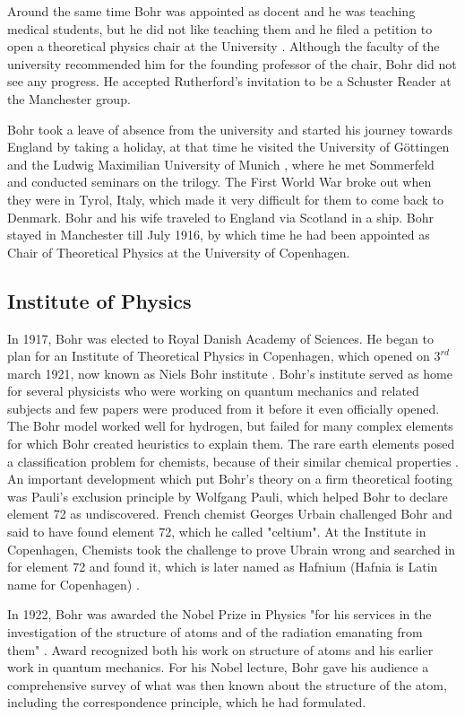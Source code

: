 \documentclass[11pt, article]{scrartcl}
\begin{document}
	Around the same time Bohr was appointed as docent and he was teaching medical students, but he did not like teaching them and he filed a petition to open 
	a theoretical physics chair at the University \cite{insti}. Although the faculty of the university recommended him for the founding professor of the chair, 
	Bohr did not see any progress. He accepted Rutherford's invitation to be a Schuster Reader at the Manchester group. 

	Bohr took a leave of absence from the university and started his journey towards England by taking a holiday, at that time he visited the University of
	Göttingen and the Ludwig Maximilian University of Munich \cite{bomb2}, where he met Sommerfeld and conducted seminars on the trilogy. The First World War broke
	out when they were in Tyrol, Italy, which made it very difficult for them to come back to Denmark. Bohr and his wife traveled to England via
	Scotland in a ship. Bohr stayed in Manchester till July 1916, by which time he had been appointed as Chair of Theoretical Physics at the University of Copenhagen. 

\subsection {Institute of Physics}
	In 1917, Bohr was elected to Royal Danish Academy of Sciences. He began to plan for an Institute of Theoretical Physics in Copenhagen, which opened on $3^{rd}$ march 1921, 
	now known as Niels Bohr institute \cite{insti}. Bohr's institute served as home for several physicists who were working on quantum
	mechanics and related subjects and few papers were produced from it before it even officially opened. The Bohr model worked well for hydrogen,
	but failed for many complex elements for which Bohr created heuristics to explain them. The rare earth elements posed a classification problem
	for chemists, because of their similar chemical properties \cite{bomb2}. An important development which put Bohr's theory on a firm theoretical footing was 
	Pauli's exclusion principle by Wolfgang Pauli, which helped Bohr to declare element 72 as undiscovered. French chemist Georges Urbain challenged
	Bohr and said to have found element 72, which he called "celtium". At the Institute in Copenhagen, Chemists took the challenge to prove Ubrain
	wrong and searched in for element 72 and found it, which is later named as Hafnium (Hafnia is Latin name for Copenhagen) \cite{hafnium}.

	In 1922, Bohr was awarded the Nobel Prize in Physics "for his services in the investigation of the structure of atoms and of the radiation emanating from them" \cite{prize}. 
	Award recognized both his work on structure of atoms and his earlier work in quantum mechanics. For his Nobel lecture, Bohr gave his audience a comprehensive survey 
	of what was then known about the structure of the atom, including the correspondence principle, which he had formulated.
\end{document}
